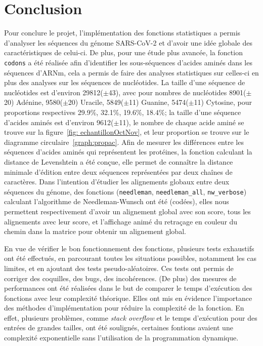 \documentclass[12pt]{article}
\begin{document}
\section*{Conclusion}
    Pour conclure le projet, l'implémentation des fonctions statistiques a permis d'analyser les séquences du génome SARS-CoV-2 et d'avoir une idée globale des caractéristiques de celui-ci. De plus, pour une étude plus avancée, la fonction \texttt{codons} a été réalisée afin d'identifier les sous-séquences d'acides aminés dans les séquences d'ARNm, cela a permis de faire des analyses statistiques sur celles-ci en plus des analyses sur les séquences de nucléotides. La taille d'une séquence de nucléotides est d'environ 29812($\pm$43), avec pour nombres de nucléotides 8901($\pm$20) Adénine, 9580($\pm$20) Uracile, 5849($\pm$11) Guanine, 5474($\pm$11) Cytosine, pour proportions respectives 29.9\%, 32.1\%, 19.6\%, 18.4\%; la taille d'une séquence d'acides aminés est d'environ 9612($\pm$11), le nombre de chaque acide aminé se trouve sur la figure~\ref{fig: echantillonOctNov}, et leur proportion se trouve sur le diagramme circulaire~\ref{graph:propac}. Afin de mesurer les différences entre les séquences d'acides aminés qui représentent les protéines, la fonction calculant la distance de Levenshtein a été conçue, elle permet de connaître la distance minimale d'édition entre deux séquences représentées par deux chaînes de caractères. Dans l'intention d'étudier les alignements globaux entre deux séquences du génome, des fonctions (\texttt{needleman}, \texttt{needleman\_all}, \texttt{nw\_verbose}) calculant l'algorithme de Needleman-Wunsch ont été (codées), elles nous permettent respectivement d'avoir un alignement global avec son score, tous les alignements avec leur score, et l'affichage animé du retraçage en couleur du chemin dans la matrice pour obtenir un alignement global.
    
    En vue de vérifier le bon fonctionnement des fonctions, plusieurs tests exhaustifs ont été effectués, en parcourant toutes les situations possibles, notamment les cas limites, et en ajoutant des tests pseudo-aléatoires. Ces tests ont permis de corriger des coquilles, des bugs, des incohérences. (De plus) des mesures de performances ont été réalisées dans le but de comparer le temps d'exécution des fonctions avec leur complexité théorique. Elles ont mis en évidence l'importance des méthodes d'implémentation pour réduire la complexité de la fonction. En effet, plusieurs problèmes, comme \textsl{stack overflow} et le temps d'exécution pour des entrées de grandes tailles, ont été soulignés, certaines fontions avaient une complexité exponentielle sans l'utilisation de la programmation dynamique.
    
\end{document}
